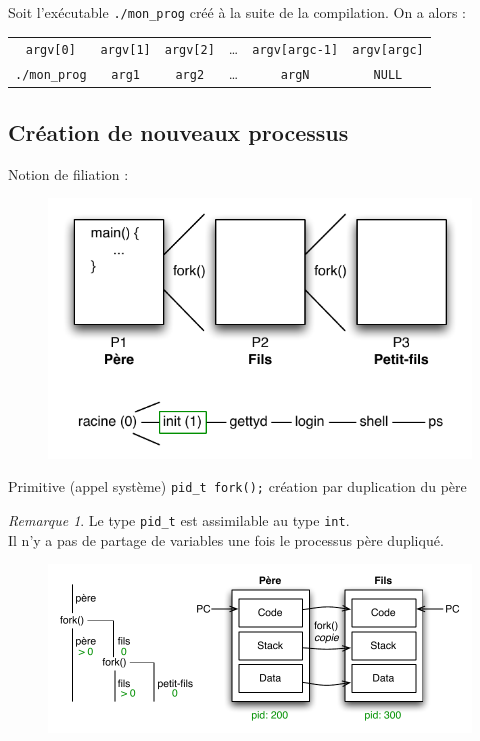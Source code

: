 \documentclass[11pt,english,french]{scrreprt}
\theoremstyle{remark}
\newtheorem*{rem*}{Remarque}
\theoremstyle{definition}
\begin{document}
Soit l'exécutable \lstinline!./mon_prog! créé à la suite de la compilation. On a alors :

\begin{tabular}{cccccc}
	\lstinline!argv[0]! & \lstinline!argv[1]! & \lstinline!argv[2]! & \dots & \lstinline!argv[argc-1]! & \lstinline!argv[argc]!\\
	\lstinline!./mon_prog! & \lstinline!arg1! & \lstinline!arg2! & \dots & \lstinline!argN! & \lstinline!NULL!\\
\end{tabular}

\subsection{Création de nouveaux processus} %
Notion de filiation :
\begin{figure}[h!]
	\center
	\includegraphics[scale=.75]{img/fork1}
\end{figure}

Primitive (appel système) \lstinline!pid_t fork();! création par duplication du père

\begin{rem*}
	Le type \lstinline!pid_t! est assimilable au type \lstinline!int!.\\
	Il n'y a pas de partage de variables une fois le processus père dupliqué.
\end{rem*}

\begin{figure}[h!]
	\center
	\includegraphics[scale=.75]{img/fork2}
\end{figure}
\end{document}
